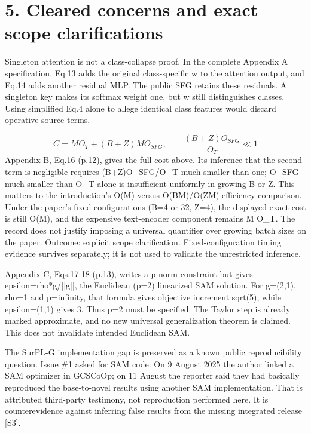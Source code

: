 \documentclass[10pt]{article}
\begin{document}
\section*{5. Cleared concerns and exact scope clarifications}
Singleton attention is not a class-collapse proof. In the complete Appendix A specification, Eq.13 adds the original class-specific w to the attention output, and Eq.14 adds another residual MLP. The public SFG retains these residuals. A singleton key makes its softmax weight one, but w still distinguishes classes. Using simplified Eq.4 alone to allege identical class features would discard operative source terms.\par
\[C=M O_T+(B+Z)M O_{SFG},\qquad\frac{(B+Z)O_{SFG}}{O_T}\ll1\] Appendix B, Eq.16 (p.12), gives the full cost above. Its inference that the second term is negligible requires (B+Z)O\_SFG/O\_T much smaller than one; O\_SFG much smaller than O\_T alone is insufficient uniformly in growing B or Z. This matters to the introduction’s O(M) versus O(BM)/O(ZM) efficiency comparison. Under the paper’s fixed configurations (B=4 or 32, Z=4), the displayed exact cost is still O(M), and the expensive text-encoder component remains M O\_T. The record does not justify imposing a universal quantifier over growing batch sizes on the paper. Outcome: explicit scope clarification. Fixed-configuration timing evidence survives separately; it is not used to validate the unrestricted inference.\par
Appendix C, Eqs.17-18 (p.13), writes a p-norm constraint but gives epsilon=rho*g/||g||, the Euclidean (p=2) linearized SAM solution. For g=(2,1), rho=1 and p=infinity, that formula gives objective increment sqrt(5), while epsilon=(1,1) gives 3. Thus p=2 must be specified. The Taylor step is already marked approximate, and no new universal generalization theorem is claimed. This does not invalidate intended Euclidean SAM.\par
The SurPL-G implementation gap is preserved as a known public reproducibility question. Issue \#1 asked for SAM code. On 9 August 2025 the author linked a SAM optimizer in GCSCoOp; on 11 August the reporter said they had basically reproduced the base-to-novel results using another SAM implementation. That is attributed third-party testimony, not reproduction performed here. It is counterevidence against inferring false results from the missing integrated release [S3].\par
\end{document}
